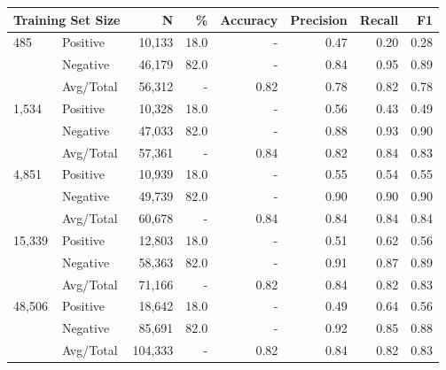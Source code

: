\begin{tabular}{llrrrrrr} \toprule
\multicolumn{2}{l}{Training Set Size} & N       & \%   & Accuracy  & Precision  & Recall  & F1   \\ \midrule
485     & Positive  & 10,133    & 18.0 & -    & 0.47 & 0.20 & 0.28 \\
        & Negative  & 46,179    & 82.0 & -    & 0.84 & 0.95 & 0.89 \\
        & Avg/Total & 56,312    & -    & 0.82 & 0.78 & 0.82 & 0.78 \\ \midrule
1,534   & Positive  & 10,328    & 18.0 & -    & 0.56 & 0.43 & 0.49 \\
        & Negative  & 47,033    & 82.0 & -    & 0.88 & 0.93 & 0.90 \\
        & Avg/Total & 57,361    & -    & 0.84 & 0.82 & 0.84 & 0.83 \\ \midrule
4,851   & Positive  & 10,939    & 18.0 & -    & 0.55 & 0.54 & 0.55 \\
        & Negative  & 49,739    & 82.0 & -    & 0.90 & 0.90 & 0.90 \\
        & Avg/Total & 60,678    & -    & 0.84 & 0.84 & 0.84 & 0.84 \\
15,339  & Positive  & 12,803    & 18.0 & -    & 0.51 & 0.62 & 0.56 \\
        & Negative  & 58,363    & 82.0 & -    & 0.91 & 0.87 & 0.89 \\
        & Avg/Total & 71,166    & -    & 0.82 & 0.84 & 0.82 & 0.83 \\
48,506  & Positive  & 18,642    & 18.0 & -    & 0.49 & 0.64 & 0.56 \\
        & Negative  & 85,691    & 82.0 & -    & 0.92 & 0.85 & 0.88 \\
        & Avg/Total & 104,333   & -    & 0.82 & 0.84 & 0.82 & 0.83 \\

\bottomrule \end{tabular}

